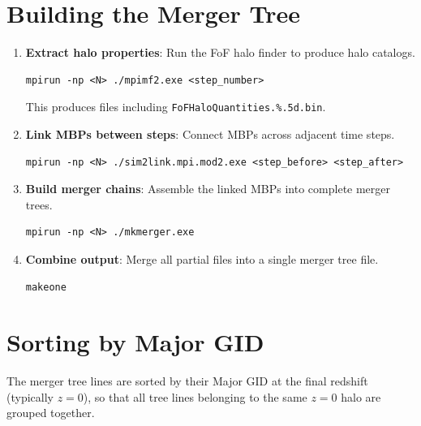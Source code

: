 \documentclass[11pt,fleqn]{book}
\newcommand{\file}[1]{\texttt{#1}}
\begin{document}
\section{Building the Merger Tree}

\begin{algorithm}
\begin{enumerate}[leftmargin=2em]
  \item \textbf{Extract halo properties}: Run the FoF halo finder to produce halo catalogs.
\begin{lstlisting}[style=bash,numbers=none]
mpirun -np <N> ./mpimf2.exe <step_number>
\end{lstlisting}
  This produces files including \file{FoFHaloQuantities.\%.5d.bin}.

  \item \textbf{Link MBPs between steps}: Connect MBPs across adjacent time steps.
\begin{lstlisting}[style=bash,numbers=none]
mpirun -np <N> ./sim2link.mpi.mod2.exe <step_before> <step_after>
\end{lstlisting}

  \item \textbf{Build merger chains}: Assemble the linked MBPs into complete merger trees.
\begin{lstlisting}[style=bash,numbers=none]
mpirun -np <N> ./mkmerger.exe
\end{lstlisting}

  \item \textbf{Combine output}: Merge all partial files into a single merger tree file.
\begin{lstlisting}[style=bash,numbers=none]
makeone
\end{lstlisting}
\end{enumerate}
\end{algorithm}

\section{Sorting by Major GID}

The merger tree lines are sorted by their Major GID at the final redshift (typically $z=0$), so that all tree lines belonging to the same $z=0$ halo are grouped together.
\end{document}

